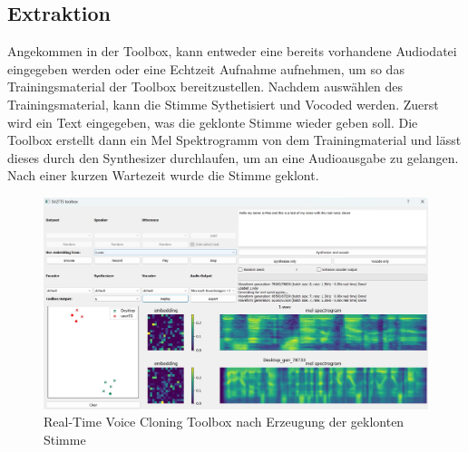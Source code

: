 \subsection{Extraktion}
Angekommen in der Toolbox, kann entweder eine bereits vorhandene Audiodatei eingegeben werden oder eine Echtzeit Aufnahme aufnehmen, um so das Trainingsmaterial der Toolbox bereitzustellen. Nachdem auswählen des Trainingsmaterial, kann die Stimme Sythetisiert und Vocoded werden. Zuerst wird ein Text eingegeben, was die geklonte Stimme wieder geben soll. Die Toolbox erstellt dann ein Mel Spektrogramm von dem Trainingmaterial und lässt dieses durch den Synthesizer durchlaufen, um an eine Audioausgabe zu gelangen. Nach einer kurzen Wartezeit wurde die Stimme geklont.
\begin{figure}[H]
    \includegraphics[width=1.0\textwidth]{Bilder/AudioToolbox2}
    \centering
    \caption{Real-Time Voice Cloning Toolbox nach Erzeugung der geklonten Stimme}
    \label{fig:RTVCloningToolboxDurchfuehrung}
\end{figure}